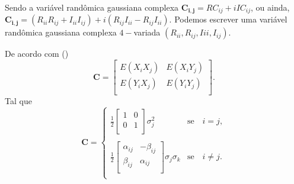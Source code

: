\documentclass[conference]{IEEEtran}
\begin{document}
Sendo a variável randômica gaussiana complexa $\mathbf{C_{i,j}}=RC_{ij} + i IC_{ij}$, ou ainda, $\mathbf{C_{i,j}}=(R_{ii}R_{ij}+I_{ii}I_{ij}) + i(R_{ij}I_{ii}-R_{ij}I_{ii})$. Podemos escrever uma variável randômica gaussiana complexa $4-$variada $(R_{ii},R_{ij},I{ii},I_{ij})$.

De acordo com (\cite{good})
\begin{equation}
\mathbf{C} = \left[
\begin{array}{cc}
	E(X_iX_j)  & E(X_iY_j)  \\
	E(Y_iX_j)  & E(Y_iY_j)  \\
\end{array}
\right].
\end{equation}
Tal que
\begin{equation}
\mathbf{C} =
\left\{
\begin{array}{cc}
	\frac{1}{2}\left[
\begin{array}{cc}
	 1 & 0  \\
	 0 & 1  \\
\end{array}
	\right]\sigma^{2}_{j}  & \mbox{se}\quad i=j, \\
	& \\
	\frac{1}{2}\left[
\begin{array}{cc}
	\alpha_{ij} & -\beta_{ij}  \\
	 \beta_{ij} & \alpha_{ij}  \\
\end{array}
	\right]\sigma_j\sigma_k  & \mbox{se}\quad i\neq j.   \\
\end{array}
\right.
\end{equation}
\end{document}
